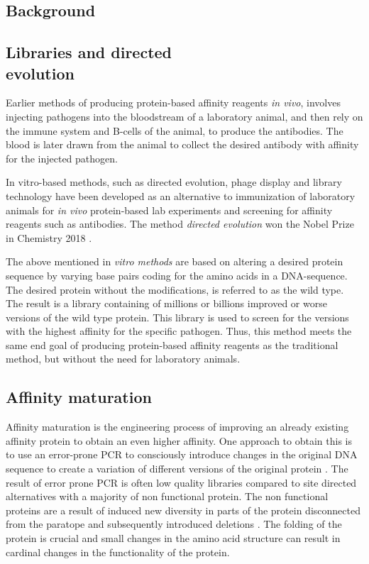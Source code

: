 \documentclass{article}
\begin{document}
	\newpage
	\begin{multicols}{2}
	\section{Background}
	\subsection[Libraries and directed evolution]{Libraries and directed\\evolution}
	Earlier methods of producing protein-based affinity reagents \textit{in vivo}, involves injecting pathogens into the bloodstream of a laboratory animal, and then rely on the immune system and B-cells of the animal, to produce the antibodies. The blood is later drawn from the animal to collect the desired antibody with affinity for the injected pathogen. 
	
	In vitro-based methods, such as directed evolution, phage display and library technology have been developed as an alternative to immunization of laboratory animals for \textit{in vivo} protein-based lab experiments and screening for affinity reagents such as antibodies. The method \textit{directed evolution} won the Nobel Prize in Chemistry 2018 \cite{noauthor_nobel_nodate}.

	The above mentioned in \textit{vitro methods} are based on altering a desired protein sequence by varying base pairs coding for the amino acids in a DNA-sequence. The desired protein without the modifications, is referred to as the wild type. The result is a library containing of millions or billions improved or worse versions of the wild type protein. This library is used to screen for the versions with the highest affinity for the specific pathogen. Thus, this method meets the same end goal of producing protein-based affinity reagents as the traditional method, but without the need for laboratory animals.
	
	\subsection{Affinity maturation}
	Affinity maturation is the engineering process of improving an already existing affinity protein to obtain an even higher affinity. One approach to obtain this is to use an error-prone PCR to consciously introduce changes in the original DNA sequence to create a variation of different versions of the original protein \cite{mishra_insights_2018}. The result of error prone PCR is often low quality libraries compared to site directed alternatives with a majority of non functional protein. The non functional proteins are a result of induced new diversity in parts of the protein disconnected from the paratope and subsequently introduced deletions \cite{mccullum_random_2010}. The folding of the protein is crucial and small changes in the amino acid structure can result in cardinal changes in the functionality of the protein. 
	

\end{multicols}
\end{document}
